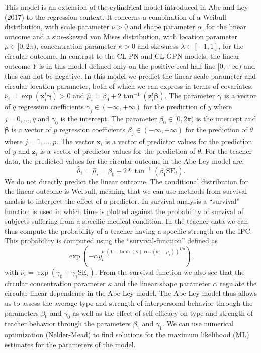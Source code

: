 \documentclass[man]{apa6}
\begin{document}
This model is an extension of the cylindrical model introduced in
Abe and Ley (2017) to the regression context. It concerns a combination
of a Weibull distribution, with scale parameter \(\nu>0\) and shape parameter
\(\alpha\), for the linear outcome and a sine-skewed von Mises distribution,
with location parameter \(\mu\in [0, 2\pi)\), concentration parameter
\(\kappa>0\) and skewness \(\lambda \in [-1,1]\), for the circular outcome. In
contrast to the CL-PN and CL-GPN models, the linear outcome \(Y\) is in this
model defined only on the positive real half-line \([0, + \infty)\) and thus can
not be negative.\newline
\indent In this model we predict the linear scale parameter and circular
location parameter, both of which we can express in terms of
covariates: \(\hat{\nu}_i = \exp(\boldsymbol{x}_i^t\boldsymbol{\gamma}) > 0\) and
\(\hat{\mu}_i = \beta_0 + 2\tan^{-1}(\boldsymbol{z}_i^t\boldsymbol{\beta})\). The
parameter \(\boldsymbol{\gamma}\) is a vector of \(q\) regression coefficients
\(\gamma_j \in (-\infty, +\infty)\) for the prediction of \(y\) where \(j = 0, \dots, q\) and \(\gamma_0\) is the intercept. The parameter \(\beta_0 \in [0, 2\pi)\) is the intercept and \(\boldsymbol{\beta}\) is a vector of \(p\)
regression coefficients \(\beta_j \in (-\infty, +\infty)\) for the prediction of
\(\theta\) where \(j = 1, \dots, p\). The vector \(\boldsymbol{x}_i\) is a
vector of predictor values for the prediction of \(y\) and \(\boldsymbol{z}_i\)
is a vector of predictor values for the prediction of \(\theta\).\newline
\indent For the teacher data, the predicted values for the circular outcome in
the Abe-Ley model are: \[\hat{\theta}_{i} = \hat{\mu}_i = \beta_0 + 2 *
\tan^{-1}(\beta_1\text{SE}_i).\] We do not directly predict the linear outcome.
The conditional distribution for the linear outcome is Weibull, meaning that we
can use methods from survival analsis to interpret the effect of a predictor. In
survival analysis a \enquote{survival} function is used in which time is plotted against
the probability of survival of subjects suffering from a specific medical
condition. In the teacher data we can thus compute the probability of a teacher
having a specific strength on the IPC. This probability is computed using the
\enquote{survival-function} defined as \[\exp(-\alpha
y_i^{\hat{\nu}_i(1-\tanh(\kappa)\cos(\theta_i - \hat{\mu}_i))^{1/\alpha}}),\]
with \(\hat{\nu}_i = \exp(\gamma_0 + \gamma_1\mbox{SE}_i)\). From the survival
function we also see that the circular concentration parameter \(\kappa\) and
the linear shape parameter \(\alpha\) regulate the circular-linear dependence in
the Abe-Ley model. The Abe-Ley model thus allows us to assess the average type
and strength of interpersonal behavior through the parameters \(\beta_{0}\) and
\(\gamma_0\) as well as the effect of self-efficacy on type and strength of
teacher behavior through the parameters \(\beta_{1}\) and \(\gamma_1\).\newline
\indent We can use numerical optimization (Nelder-Mead) to find solutions for
the maximum likelihood (ML) estimates for the parameters of the model.
\end{document}
